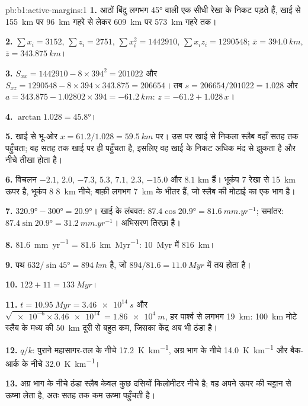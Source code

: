 \begin{solution}{pb:b1:active-margins:1}
\textbf{1.} आठों बिंदु लगभग \ang{45}  वाली एक सीधी रेखा के निकट पड़ते हैं, खाई से \qty{155}{km} पर \qty{96}{km} गहरे से लेकर \qty{609}{km} पर \qty{573}{km} गहरे तक।

\textbf{2.} $\sum x_i = 3152$, $\sum z_i = 2751$, $\sum x_i^2 = \num{1442910}$, $\sum x_i z_i = \num{1290548}$; $\bar x = \qty{394.0}{km}$, $\bar z = \qty{343.875}{km}$।

\textbf{3.} $S_{xx} = 1442910 - 8\times394^2 = \num{201022}$ और $S_{xz} = 1290548 - 8\times394\times343.875 = \num{206654}$। तब $s = 206654/201022 = 1.028$ और $a = 343.875 - 1.02802\times394 =
\qty{-61.2}{km}$: $z = -61.2 + 1.028\,x$।

\textbf{4.} $\arctan1.028 = \ang{45.8}$।

\textbf{5.} खाई से भू-ओर $x = 61.2/1.028 = \qty{59.5}{km}$ पर। उस  पर खाई से निकला स्लैब वहाँ सतह तक पहुँचता; वह सतह तक खाई पर ही पहुँचता है, इसलिए वह खाई के निकट अधिक मंद  से झुकता है और नीचे तीखा होता है।

\textbf{6.} विचलन $-2.1$, $2.0$, $-7.3$, $5.3$, $7.1$, $2.3$, $-15.0$ और $8.1$ \unit{km} हैं। भूकंप 7 रेखा से \qty{15}{km} ऊपर है, भूकंप 8 \qty{8}{km} नीचे; बाक़ी लगभग \qty{7}{km} के भीतर हैं, जो स्लैब की मोटाई का एक भाग है।

\textbf{7.} $\ang{320.9} - \ang{300} = \ang{20.9}$। खाई के लंबवत: $87.4\cos\ang{20.9} = \qty{81.6}{mm.yr^{-1}}$; समांतर: $87.4\sin\ang{20.9} = \qty{31.2}{mm.yr^{-1}}$। अभिसरण तिरछा है।

\textbf{8.} \qty{81.6}{mm.yr^{-1}} = \qty{81.6}{km.Myr^{-1}}: \qty{10}{Myr} में \qty{816}{km}।

\textbf{9.} पथ $632/\sin\ang{45} = \qty{894}{km}$ है, जो $894/81.6 = \qty{11.0}{Myr}$ में तय होता है।

\textbf{10.} $122 + 11 = \qty{133}{Myr}$।

\textbf{11.} $t = \qty{10.95}{Myr} = \qty{3.46e14}{s}$ और $\sqrt{\num{e-6}\times\num{3.46e14}} = \qty{1.86e4}{m}$, हर पार्श्व से लगभग \qty{19}{km}: \qty{100}{km} मोटे स्लैब के मध्य की \qty{50}{km} दूरी से बहुत कम, जिसका केंद्र अब भी ठंडा है।

\textbf{12.} $q/k$: पुराने महासागर-तल के नीचे \qty{17.2}{K.km^{-1}}, अग्र भाग के नीचे \qty{14.0}{K.km^{-1}} और बैक-आर्क के नीचे \qty{32.0}{K.km^{-1}}।

\textbf{13.} अग्र भाग के नीचे ठंडा स्लैब केवल कुछ दसियों किलोमीटर नीचे है; वह अपने ऊपर की चट्टान से ऊष्मा लेता है, अतः सतह तक कम ऊष्मा पहुँचती है।


\end{solution}
